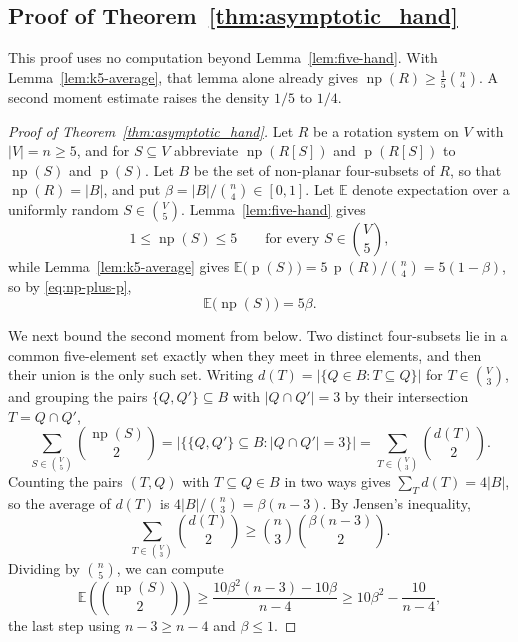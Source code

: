 \documentclass{article}
\theoremstyle{plain}
\theoremstyle{definition}
\theoremstyle{remark}
\newcommand{\np}{\operatorname{np}}
\newcommand{\p}{\operatorname{p}}
\begin{document}
\subsection{Proof of Theorem~\ref{thm:asymptotic_hand}}\label{subsec:hand}

This proof uses no computation beyond Lemma~\ref{lem:five-hand}.  With
Lemma~\ref{lem:k5-average}, that lemma alone already gives
\(\np(R)\geq\frac15\binom n4\).  A second moment estimate raises the
density \(1/5\) to \(1/4\).

\begin{proof}[Proof of Theorem~\ref{thm:asymptotic_hand}]
Let \(R\) be a rotation system on \(V\) with \(|V|=n\geq5\), and for
\(S\subseteq V\) abbreviate \(\np(R[S])\) and \(\p(R[S])\) to
\(\np(S)\) and \(\p(S)\).  Let \(B\) be the set of non-planar
four-subsets of \(R\), so that \(\np(R)=|B|\), and put
\(\beta=|B|/\binom n4\in[0,1]\).  Let \(\mathbb E\) denote expectation
over a uniformly random \(S\in\binom V5\).  Lemma~\ref{lem:five-hand}
gives
\begin{equation}\label{eq:np-range}
1\leq\np(S)\leq5
\qquad\text{for every }S\in\binom V5 ,
\end{equation}
while Lemma~\ref{lem:k5-average} gives
\(\mathbb E\bigl(\p(S)\bigr)=5\,\p(R)/\binom n4=5(1-\beta)\), so by
\eqref{eq:np-plus-p},
\begin{equation}\label{eq:first-moment}
\mathbb E\bigl(\np(S)\bigr)=5\beta .
\end{equation}

We next bound the second moment from below.  Two distinct four-subsets
lie in a common five-element set exactly when they meet in three
elements, and then their union is the only such set.  Writing
\(d(T)=|\{Q\in B: T\subseteq Q\}|\) for \(T\in\binom V3\), and
grouping the pairs \(\{Q,Q'\}\subseteq B\) with \(|Q\cap Q'|=3\) by
their intersection \(T=Q\cap Q'\),
\[
\sum_{S\in\binom V5}\binom{\np(S)}2
=\bigl|\{\{Q,Q'\}\subseteq B: |Q\cap Q'|=3\}\bigr|
=\sum_{T\in\binom V3}\binom{d(T)}2 .
\]
Counting the pairs \((T,Q)\) with \(T\subseteq Q\in B\) in two ways
gives \(\sum_Td(T)=4|B|\), so the average of \(d(T)\) is
\(4|B|/\binom n3=\beta(n-3)\).  By Jensen's inequality,
\[
\sum_{T\in\binom V3}\binom{d(T)}2
\geq\binom n3\binom{\beta(n-3)}2.
\]
Dividing by \(\binom n5\), we can compute
\begin{equation}\label{eq:second-moment}
\mathbb E\left(\binom{\np(S)}2\right)
\geq\frac{10\beta^2(n-3)-10\beta}{n-4}
\geq10\beta^2-\frac{10}{n-4},
\end{equation}
the last step using \(n-3\geq n-4\) and \(\beta\leq1\).


\end{proof}
\end{document}

